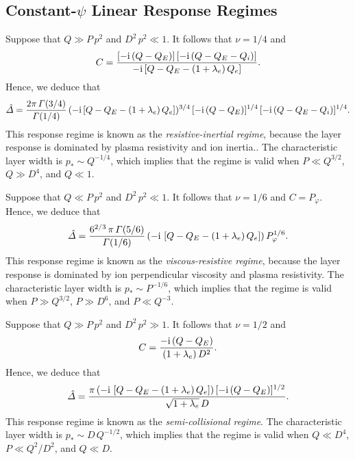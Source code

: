 \documentclass[12pt,prb,aps]{revtex4-1}
\begin{document}
\subsection{Constant-$\psi$ Linear Response Regimes}\label{scp}
Suppose that $Q\gg P\,p^2$ and $D^2\,p^2 \ll 1$. It follows that $\nu=1/4$ and
\begin{equation}
C = \frac{[-{\rm i}\,(Q-Q_E)]\,[-{\rm i}\,(Q-Q_E-Q_i)]}{-{\rm i}\,[Q-Q_E-(1+\lambda_e)\,Q_e]}.
\end{equation}
Hence, we deduce that
\begin{equation}\label{ri}
\hat{\mit\Delta} = \frac{2\pi\,{\mit\Gamma}(3/4)}{{\mit\Gamma}(1/4)}\,(-{\rm i}\,[Q-Q_E-(1+\lambda_e)\,Q_e])^{3/4}\,[-{\rm i}\,(Q-Q_E)]^{1/4}\,[-{\rm i}\,(Q-Q_E-Q_i)]^{1/4}.
\end{equation}
This response regime is known as the {\em resistive-inertial regime}, because the layer response is dominated by
plasma resistivity and ion inertia.\cite{fkr,ara,rf1998}. The characteristic layer width is $p_\ast \sim Q^{-1/4}$,
which implies that the regime is valid when $P\ll Q^{3/2}$, $Q\gg D^4$, and $Q\ll 1$. 

Suppose that $Q\ll P\,p^2$ and $D^2\,p^2\ll 1$. It follows that $\nu=1/6$ and $C=P_\varphi$. 
Hence, we deduce that
\begin{equation}\label{vr}
\hat{\mit\Delta} = \frac{6^{2/3}\,\pi\,{\mit\Gamma}(5/6)}{{\mit\Gamma}(1/6)}\, (-{\rm i}\,\left[Q-Q_E-(1+\lambda_e)\,Q_e\right])\,P_\varphi^{1/6}.
\end{equation}
This response regime is known as the {\em viscous-resistive regime}, because the layer response is dominated by
  ion perpendicular viscosity and plasma resistivity.\cite{rf1993,bond} The characteristic layer width is $p_\ast \sim P^{-1/6}$, which implies that
the regime is valid when  $P\gg Q^{3/2}$, $P\gg D^6$, and $P\ll Q^{-3}$. 

Suppose that $Q\gg P\,p^2$ and $D^2\,p^2\gg 1$. It follows that $\nu=1/2$ and
\begin{equation}
C = \frac{-{\rm i}\,(Q-Q_E)}{(1+\lambda_e)\,D^2}.
\end{equation}
Hence, we deduce that
\begin{equation}\label{sc}
\hat{\mit\Delta}= \frac{\pi\,(-{\rm i}\,\left[Q-Q_E-(1+\lambda_e)\,Q_e\right])\,[-{\rm i}\,(Q-Q_E)]^{1/2}}{\sqrt{1+\lambda_e}\,D}.
\end{equation}
This response regime is known as the {\em semi-collisional regime}.\cite{drake,wal} The characteristic
layer width is $p_\ast\sim D\,Q^{-1/2}$, which implies that the regime is valid when $Q\ll D^4$,
 $P\ll Q^2/D^2$, and $Q\ll D$. 
\end{document}
